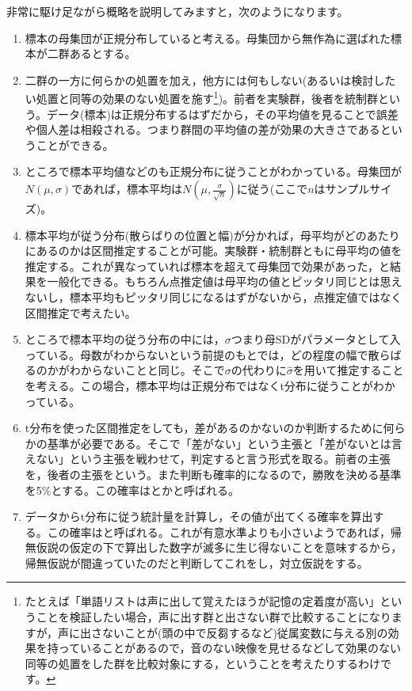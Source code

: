 \documentclass{ltjsbook}
\begin{document}
非常に駆け足ながら概略を説明してみますと，次のようになります。
\begin{enumerate}
    \item 標本の母集団が正規分布していると考える。母集団から無作為に選ばれた標本が二群あるとする。
    \item 二群の一方に何らかの処置を加え，他方には何もしない(あるいは検討したい処置と同等の効果のない処置を施す\footnote{たとえば「単語リストは声に出して覚えたほうが記憶の定着度が高い」ということを検証したい場合，声に出す群と出さない群で比較することになりますが，声に出さないことが(頭の中で反芻するなど)従属変数に与える別の効果を持っていることがあるので，音のない映像を見せるなどして効果のない同等の処置をした群を比較対象にする，ということを考えたりするわけです。})。前者を実験群，後者を統制群という。データ(標本)は正規分布するはずだから，その平均値を見ることで誤差や個人差は相殺される。つまり群間の平均値の差が効果の大きさであるということができる。
    \item ところで標本平均値などのも正規分布に従うことがわかっている。母集団が$N(\mu,\sigma)$であれば，標本平均は$N(\mu, \frac{\sigma}{\sqrt{n}})$に従う(ここで$n$はサンプルサイズ)。
    \item 標本平均が従う分布(散らばりの位置と幅)が分かれば，母平均がどのあたりにあるのかは区間推定することが可能。実験群・統制群ともに母平均の値を推定する。これが異なっていれば標本を超えて母集団で効果があった，と結果を一般化できる。もちろん点推定値は母平均の値とピッタリ同じとは思えないし，標本平均もピッタリ同じになるはずがないから，点推定値ではなく区間推定で考えたい。
    \item ところで標本平均の従う分布の中には，$\sigma$つまり母SDがパラメータとして入っている。母数がわからないという前提のもとでは，どの程度の幅で散らばるのかがわからないことと同じ。そこで$\sigma$の代わりに$\hat{\sigma}$を用いて推定することを考える。この場合，標本平均は正規分布ではなくt分布に従うことがわかっている。
    \item t分布を使った区間推定をしても，差があるのかないのか判断するために何らかの基準が必要である。そこで「差がない」という主張と「差がないとは言えない」という主張を戦わせて，判定すると言う形式を取る。前者の主張を，後者の主張をという。また判断も確率的になるので，勝敗を決める基準を5\%とする。この確率はとかと呼ばれる。
    \item データからt分布に従う統計量を計算し，その値が出てくる確率を算出する。この確率はと呼ばれる。これが有意水準よりも小さいようであれば，帰無仮説の仮定の下で算出した数字が滅多に生じ得ないことを意味するから，帰無仮説が間違っていたのだと判断してこれをし，対立仮説をする。
\end{enumerate}
\end{document}
